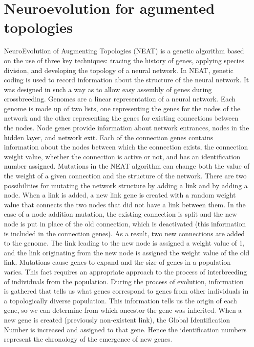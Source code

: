 \section{Neuroevolution for agumented topologies}
NeuroEvolution of Augmenting Topologies (NEAT) is a genetic algorithm based on the use of three 
key techniques: tracing the history of genes, applying species division, and developing the 
topology of a neural network. 
In NEAT, genetic coding is used to record information about the structure of the neural network. 
It was designed in such a way as to allow easy assembly of genes during crossbreeding. 
Genomes are a linear representation of a neural network. Each genome is made up of two lists, 
one representing the genes for the nodes of the network and the other representing the 
genes for existing connections between the nodes. Node genes provide information about network 
entrances, nodes in the hidden layer, and network exit. 
Each of the connection genes contains information about the nodes between which the connection 
exists, the connection weight value, whether the connection is active or not, 
and has an identification number assigned. 
Mutations in the NEAT algorithm can change both the value of the weight of a given connection and 
the structure of the network. 
There are two possibilities for mutating the network structure by adding a link and by adding 
a node. 
When a link is added, a new link gene is created with a random weight value that connects the 
two nodes that did not have a link between them. 
In the case of a node addition mutation, the existing connection is split and the new node is put 
in place of the old connection, which is deactivated (this information is included in 
the connection genes). 
As a result, two new connections are added to the genome. 
The link leading to the new node is assigned a weight value of 1, and the link originating from 
the new node is assigned the weight value of the old link. 
Mutations cause genes to expand and the size of genes in a population varies. 
This fact requires an appropriate approach to the process of interbreeding of individuals from the 
population. During the process of evolution, information is gathered that tells us what genes 
correspond to genes from other individuals in a topologically diverse population. 
This information tells us the origin of each gene, so we can determine from which ancestor the 
gene was inherited. 
When a new gene is created (previously non-existent link), the Global Identification Number is 
increased and assigned to that gene. 
Hence the identification numbers represent the chronology of the emergence of new genes. 
